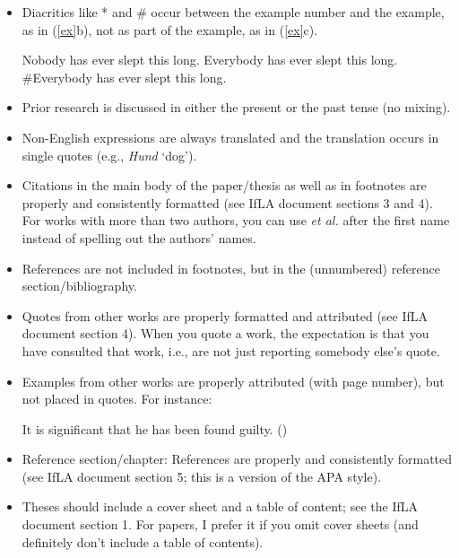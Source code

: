 \documentclass[11pt,fleqn,a4paper/thesis]{article}
\def\infelic{{\leavevmode\llap{\#}}}
\newcommand{\6}{\mbox{$[\hspace*{-.6mm}[$}}
\newcommand{\9}{\mbox{$]\hspace*{-.6mm}]$}}
\begin{document}
\begin{itemize}[itemsep=-1pt,leftmargin=2.5ex,topsep=-2pt]
\item Diacritics like * and \# occur between the example number and the example, as in (\ref{ex}b), not as part of the example, as in (\ref{ex}c).

\begin{exe}
\ex\label{ex}
\begin{xlist}
\ex Nobody has ever slept this long.
\ex \infelic Everybody has ever slept this long.
\ex \#Everybody has ever slept this long.
\end{xlist}
\end{exe}

\item Prior research is discussed in either the present or the past tense (no mixing).

\item Non-English expressions are always translated and the translation occurs in single quotes (e.g., {\em Hund} `dog').

\item Citations in the main body of the paper/thesis as well as in footnotes are properly and consistently formatted (see IfLA document sections 3 and 4). For works with more than two authors, you can use {\em et al.} after the first name instead of spelling out the authors' names. 

\item References are not included in footnotes, but in the (unnumbered) reference section/bibliography.

\item Quotes from other works are properly formatted and attributed (see IfLA document section 4). When you quote a work, the expectation is that you have consulted that work, i.e., are not just reporting somebody else's quote.

\item Examples from other works are properly attributed (with page number), but not placed in quotes. For instance:

\begin{exe}
\ex It is significant that he has been found guilty. \hfill (\citealt[144]{kiparsky-kiparsky70})
\end{exe}

\item Reference section/chapter: References are properly and consistently formatted (see IfLA document section 5; this is a version of the APA style).

\item Theses should include a cover sheet and a table of content; see the IfLA document section 1. For papers, I prefer it if you omit cover sheets (and definitely don't include a table of contents).

\end{itemize}
	


\end{document}
